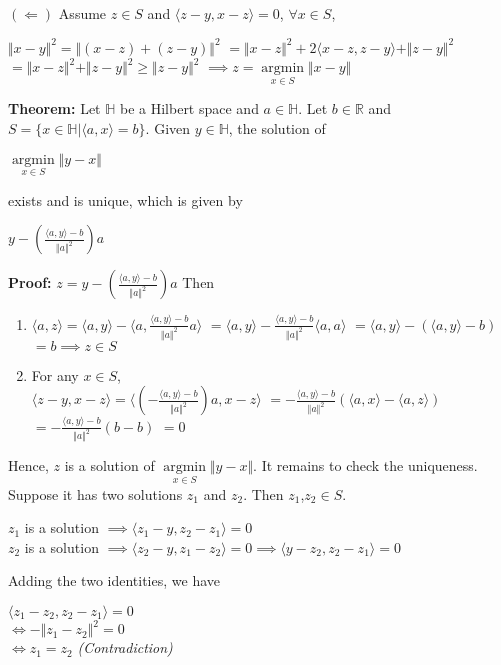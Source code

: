 \documentclass{article}
\begin{document}
$(\Leftarrow)$ Assume $z \in S$ and $\langle z-y, x-z\rangle  = 0$, $\forall x \in S$,
\begin{center}
    $\Vert x - y \Vert^2 = \Vert (x - z) + (z - y) \Vert^2$ \bigbreak $= \Vert x - z \Vert^2 + 2 \langle x-z,z-y\rangle  + \Vert z - y \Vert^2 $ \bigbreak $= \Vert x - z \Vert^2 + \Vert z - y \Vert^2 \geq \Vert z - y \Vert^2$ \bigbreak $\implies z = \underset{x \in S}{\operatorname*{argmin}} \Vert x - y \Vert$
\end{center}

\pagebreak

\textbf{Theorem:} Let $\mathbb{H}$ be a Hilbert space and $a \in \mathbb{H}$. Let $b \in \mathbb{R}$ and $S = \{x \in \mathbb{H} | \langle a,x\rangle  = b\}$. Given $y \in \mathbb{H}$, the solution of 
\begin{center}
    $\underset{x \in S}{\operatorname*{argmin}}\Vert y - x \Vert$
\end{center}
exists and is unique, which is given by
\begin{center}
    $y - (\frac{\langle a,y\rangle -b}{\Vert a \Vert^2})a$
\end{center}
    
\bigbreak 

\textbf{Proof:} $z = y - (\frac{\langle a,y\rangle -b}{\Vert a \Vert^2})a$ \bigbreak
Then
\begin{enumerate}
    \item $\langle a,z\rangle  = \langle a,y\rangle  - \langle a, \frac{\langle a,y\rangle -b}{\Vert a \Vert^2} a\rangle $ \bigbreak
          $ = \langle a,y\rangle  - \frac{\langle a,y\rangle -b}{\Vert a \Vert^2} \langle a,a\rangle $ \bigbreak
          $ = \langle a,y\rangle  - (\langle a,y\rangle  - b)$ \bigbreak
          $ = b \implies z \in S$ 
    \item For any $x \in S$, \\
          $\langle z-y,x-z\rangle  = \langle (-\frac{\langle a,y\rangle -b} {\Vert a \Vert^2})a,x-z\rangle $ \bigbreak
          $ = -\frac{\langle a,y\rangle -b}{\Vert a \Vert^2}(\langle a,x\rangle  - \langle a,z\rangle )$ \bigbreak
          $ = - \frac{\langle a,y\rangle -b}{\Vert a \Vert^2}(b - b)$ \bigbreak
          $ = 0$ \\
          
    
\end{enumerate}
Hence, $z$ is a solution of $\underset{x \in S}{\operatorname*{argmin}} \Vert y - x \Vert$. It remains to check the uniqueness. Suppose it has two solutions $z_1$ and $z_2$. Then $z_1$,$z_2\in S$.
\begin{center}
    $z_1$ is a solution $\implies \langle z_1-y,z_2-z_1 \rangle = 0$ \\
    $z_2$ is a solution $\implies \langle z_2-y, z_1-z_2 \rangle = 0 \implies \langle y - z_2, z_2 - z_1 \rangle = 0$ 
\end{center}
Adding the two identities, we have
\begin{center}
    $\langle z_1-z_2,z_2-z_1 \rangle = 0$ \\
    $\iff -\Vert z_1 - z_2 \Vert^2 = 0$ \\
    $\iff z_1 = z_2 $ \textit{(Contradiction)}
\end{center}
\end{document}
